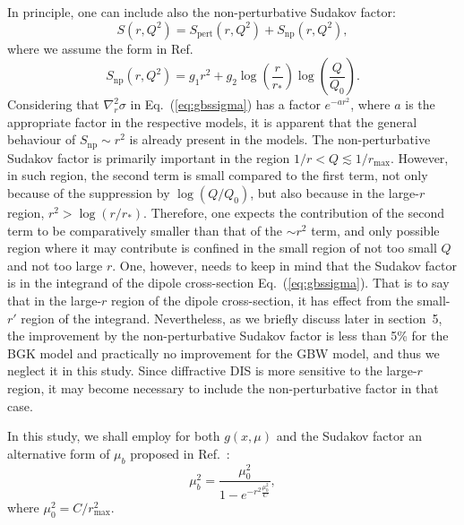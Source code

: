 \documentclass[11pt]{article}
\begin{document}
In principle, one can include also the non-perturbative Sudakov factor\cite{css1985, prokudin2015}:
\begin{equation}
S(r,Q^2)= S_\mathrm{pert}(r,Q^2)+S_\mathrm{np}(r,Q^2),
\end{equation}
where we assume the form in Ref.~\cite{prokudin2015}
\begin{equation}
S_\mathrm{np}(r,Q^2)=g_1r^2+g_2\log\left(\frac{r}{r_*}\right)\log\left(\frac{Q}{Q_0}\right).
\end{equation}
Considering that $\nabla^2_r \sigma$ in Eq.~(\ref{eq:gbssigma}) has a factor $e^{-a r^2}$, where $a$ is the appropriate factor in the respective models, it is apparent that the general behaviour of $S_\mathrm{np}\sim r^2$ is already present in the models. 
The non-perturbative Sudakov factor is primarily important in the region $1/r<Q\lesssim 1/r_{\mathrm{max}}$. However, in such region, the second term is small compared to the first term, not only because of the suppression by $\log(Q/Q_0)$, but also because in the large-$r$ region, $r^2>\log\left({r}/{r_*}\right)$.  Therefore, one expects the contribution of the second term to be comparatively smaller than that of the $\sim r^2$ term, and only possible region where it may contribute is confined in the small region of not too small $Q$ and not too large $r$. One, however, needs to keep in mind that the Sudakov factor is in the integrand of the dipole cross-section Eq.~(\ref{eq:gbssigma}). That is to say that in the large-$r$ region of the dipole cross-section, it has effect from the small-$r'$ region of the integrand.
Nevertheless, as we briefly discuss later in section~5, the improvement by the non-perturbative Sudakov factor is less than 5\% for the BGK model and practically no improvement for the GBW model, and thus we neglect it in this study. Since diffractive DIS is more sensitive to the large-$r$ region, it may become necessary to include the non-perturbative factor in that case.

In this study, we shall employ for both $g(x,\mu)$ and the Sudakov factor an alternative form of $\mu_b$ proposed in Ref.~\cite{gbs2018}:
\begin{equation}
\mu_b^2= \frac{\mu_0^2}{1-e^{-r^2\frac{\mu_0^2}{C} }},
\label{eq:newstar}
\end{equation}
where $\mu_0^2=C/r_{\mathrm{max}}^2$.

\end{document}
